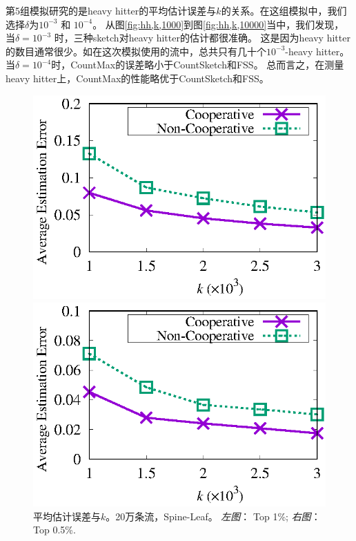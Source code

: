 第5组模拟研究的是heavy hitter的平均估计误差与$k$的关系。在这组模拟中，我们选择$\delta$为$10^{-3}$ 和 $10^{-4}$。
从图\ref{fig:hh,k,1000}到图\ref{fig:hh,k,10000}当中，我们发现，当$\delta =10^{-3}$ 时，三种sketch对heavy hitter的估计都很准确。
这是因为heavy hitter的数目通常很少。如在这次模拟使用的流中，总共只有几十个$10^{-3}$-heavy hitter。
当$\delta = 10^{-4}$时，CountMax的误差略小于CountSketch和FSS。
总而言之，在测量heavy hitter上，CountMax的性能略优于CountSketch和FSS。


\begin{figure}[!t]
	\centering
	\begin{minipage}[t]{0.49\linewidth}
		\centering
		\includegraphics[width=\linewidth]{fig/half_eg_099_k.eps}
	\end{minipage}\vspace{-0.6em}%
	\begin{minipage}[t]{0.49\linewidth}
		\centering
		\includegraphics[width=\linewidth]{fig/half_eg_095_k.eps}
	\end{minipage}\vspace{-0.6em}%
	\caption{\textnormal{平均估计误差与$k$。20万条流，Spine-Leaf。 \textit{左图}： Top 1\%; \textit{右图}： Top 0.5\%.}}
	\label{fig:coop,acc,k}
\end{figure}


